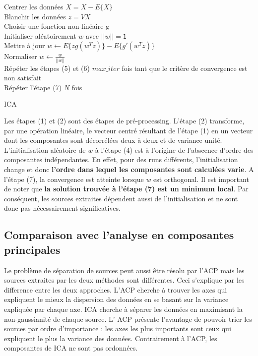 \documentclass[11pt, openany]{report}
\begin{document}
\begin{algorithm}[H]

    Centrer les données  $ X = X - E \{X \}$ \\
    Blanchir les données $z = VX$ \\
    Choisir une fonction non-linéaire g \\
    Initialiser aléatoirement $w$ avec $||w||=\mathsf{1}$ \\
    Mettre à jour $w\leftarrow E \{zg(w^Tz)\} - E\{g'(w^Tz)\}$ \\
    Normaliser $w\leftarrow \frac{w}{||w||}$ \\
    Répéter les étapes (5) et (6) $max\_iter$ fois tant que le critère de convergence est non satisfait\\
    Répéter l'étape (7) $N$ fois\\
\caption{ICA}
\end{algorithm}

Les étapes (1) et (2) sont des étapes de pré-processing. L'étape (2) transforme, par une opération linéaire, le  vecteur  centré  résultant de l'étape (1) en  un vecteur dont les composantes sont décorrélées deux à deux et de variance unité. L'initialisation aléatoire de $w$ à l'étape (4) est à l'origine de l'abscence d'ordre des composantes indépendantes. En effet, pour des runs différents, l'initialisation change et donc \textbf{l'ordre dans lequel les composantes sont calculées varie}. A l'étape (7), la convergence est atteinte lorsque $w$ est orthogonal. Il est important de noter que \textbf{la solution trouvée à l'étape (7) est un minimum local}. Par conséquent, les sources extraites dépendent aussi de l'initialisation et ne sont donc pas nécessairement significatives.

\subsection{Comparaison avec l'analyse en composantes principales}
Le problème de séparation de sources peut aussi être résolu par l'ACP mais les sources extraites par les deux méthodes sont différentes. Ceci s'explique par les difference entre les deux approches. L'ACP cherche à trouver les axes qui expliquent le mieux la dispersion des données en se basant sur la variance expliquée par chaque axe. ICA cherche à séparer les données en maximisant la non-gaussianité de chaque source. L' ACP présente l'avantage de pouvoir trier les sources par ordre d'importance : les axes les plus importants sont ceux qui expliquent le plus la variance des données. Contrairement à l'ACP, les composantes de ICA ne sont pas ordonnées.
\end{document}

